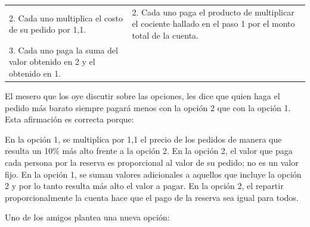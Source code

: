 \documentclass[10pt,addpoints]{exam}
\begin{document}
\begin{questions}
{\begin{center}
\begin{tabular}{|p{}|p{}|}
2. Cada uno multiplica el costo de su pedido por 1,1. & 2. Cada uno paga el producto de multiplicar el
cociente hallado en el paso 1 por el monto total
de la cuenta. \\ 
3. Cada uno paga la suma del valor obtenido en 2 y el
obtenido en 1. &  \\ 
\hline 
\end{tabular} 
\end{center}
}
\question \label{q1} El mesero que los oye discutir sobre las opciones, les dice que quien haga el pedido más barato siempre pagará menos con la opción 2 que con la opción 1. Esta afirmación es correcta porque:
\begin{choices}
\choice En la opción 1, se multiplica por 1,1 el precio de los pedidos de manera que resulta un 10\% más alto frente a la opción 2.
\CorrectChoice En la opción 2, el valor que paga cada persona por la reserva es proporcional al valor de su pedido; no es un valor fijo.
\choice En la opción 1, se suman valores adicionales a aquellos que incluye la opción 2 y por lo tanto resulta más alto el valor a pagar.
\choice En la opción 2, el repartir proporcionalmente la cuenta hace que el pago de la reserva sea igual para todos.
\end{choices}
\question \label{q2} Uno de los amigos plantea una nueva opción:


\end{questions}
\end{document}

